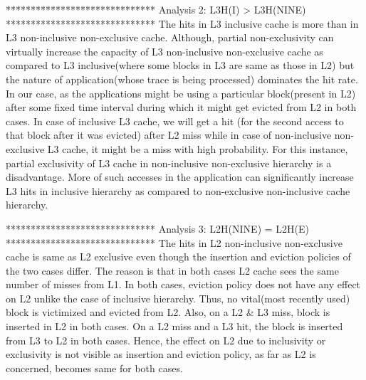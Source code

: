 \documentclass[12pt]{article}
\begin{document}
******************************
Analysis 2: L3H(I) > L3H(NINE)
******************************
The hits in L3 inclusive cache is more than in L3 non-inclusive non-exclusive cache. Although, partial non-exclusivity can virtually increase the capacity of L3 non-inclusive non-exclusive cache as compared to L3 inclusive(where some blocks in L3 are same as those in L2) but the nature of application(whose trace is being processed) dominates the hit rate. In our case, as the applications might be using a particular block(present in L2) after some fixed time interval during which it might get evicted from L2 in both cases. In case of inclusive L3 cache, we will get a hit (for the second access to that block after it was evicted) after L2 miss while in case of non-inclusive non-exclusive L3 cache, it might be a miss with high probability. For this instance, partial exclusivity of L3 cache in non-inclusive non-exclusive hierarchy is a disadvantage. More of such accesses in the application can significantly increase L3 hits in inclusive hierarchy as compared to non-exclusive non-inclusive cache hierarchy.

******************************
Analysis 3: L2H(NINE) = L2H(E)
******************************
The hits in L2 non-inclusive non-exclusive cache is same as L2 exclusive even though the insertion and eviction policies of the two cases differ. The reason is that in both cases L2 cache sees the same number of misses from L1. In both cases, eviction policy does not have any effect on L2 unlike the case of inclusive hierarchy. Thus, no vital(most recently used) block is victimized and evicted from L2. Also, on a L2 & L3 miss, block is inserted in L2 in both cases. On a L2 miss and a L3 hit, the block is inserted from L3 to L2 in both cases. Hence, the effect on L2 due to inclusivity or exclusivity is not visible as insertion and eviction policy, as far as L2 is concerned, becomes same for both cases.
\end{document}

